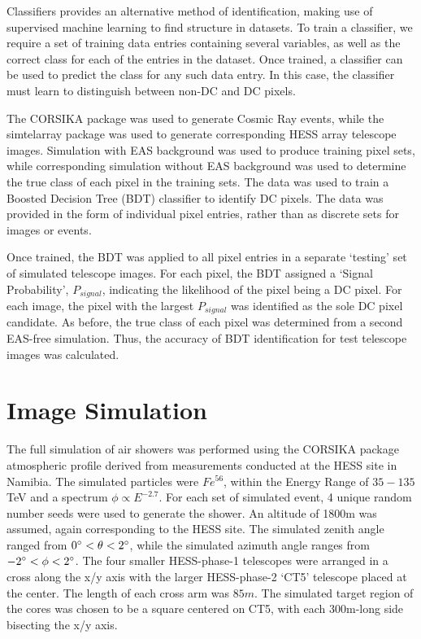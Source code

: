 \documentclass[]{article}
\begin{document}
Classifiers provides an alternative method of identification, making use of supervised machine learning to find structure in datasets. To train a classifier, we require a set of training data entries containing several variables, as well as the correct class for each of the entries in the dataset. Once trained, a classifier can be used to predict the class for any such data entry. In this case, the classifier must learn to distinguish between non-DC and DC pixels. 

The CORSIKA package \cite{Heck98} was used to generate Cosmic Ray events, while the sim\textunderscore telarray package  \cite{Bernlohr08} was used to generate corresponding HESS array telescope images.  Simulation with EAS background was used to produce training pixel sets, while corresponding simulation without EAS background was used to determine the true class of each pixel in the training sets. The data was used to train a Boosted Decision Tree (BDT) classifier to identify DC pixels. The data was provided in the form of individual pixel entries, rather than as discrete sets for images or events.

Once trained, the BDT was applied to all pixel entries in a separate \textquoteleft testing' set of simulated telescope images. For each pixel, the BDT assigned a \textquoteleft Signal Probability', $P_{signal}$, indicating the likelihood of the pixel being a DC pixel. For each image, the pixel with the largest $P_{signal}$ was identified as the sole DC pixel candidate. As before, the true class of each pixel was determined from a second EAS-free simulation. Thus, the accuracy of BDT identification for test telescope images was calculated.

\section{Image Simulation}
The full simulation of air showers was performed using the CORSIKA package atmospheric profile derived from measurements conducted at the HESS site in Namibia. The simulated particles were $Fe^{56}$, within the Energy Range of $35-135$ TeV and a spectrum $\phi \propto E^{-2.7}$. For each set of simulated event, 4 unique random number seeds were used to generate the shower. An altitude of 1800m was assumed, again corresponding to the HESS site. The simulated zenith angle ranged from $0\degree < \theta < 2 \degree$, while the simulated azimuth angle ranges from $-2\degree < \phi < 2 \degree$. The four smaller HESS-phase-1 telescopes were arranged in a cross along the x/y axis with the larger HESS-phase-2 \textquoteleft CT5' telescope placed at the center. The length of each cross arm was $85m$. The simulated target region of the cores was chosen to be a square centered on CT5, with each 300m-long side bisecting the x/y axis.
\end{document}
